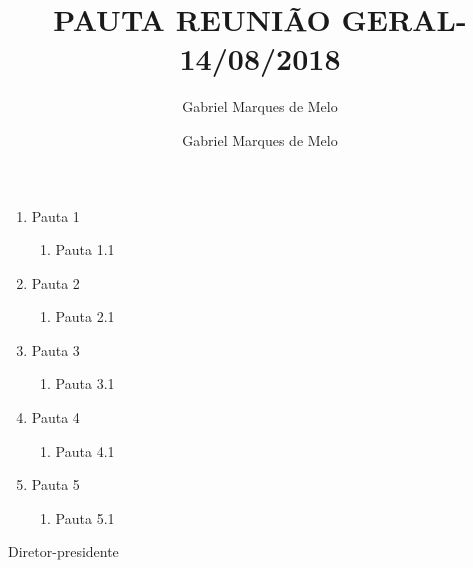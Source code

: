 





\def\reuniao{REUNIÃO GERAL}
\def\data{14/08/2018}
\def\titulo{PAUTA \reuniao - \data}

\title{\titulo}
\date{}
\author{Gabriel Marques de Melo}


	\initdoc    

    \begin{enumerate}
    	\item Pauta 1
    	\begin{enumerate}
    		\item Pauta 1.1
    	\end{enumerate}
    	\item Pauta 2
    	\begin{enumerate}
    		\item Pauta 2.1
    	\end{enumerate}
    	\item Pauta 3
    	\begin{enumerate}
    		\item Pauta 3.1
    	\end{enumerate}
    	\item Pauta 4
    	\begin{enumerate}
    		\item Pauta 4.1
    	\end{enumerate}
    	\item Pauta 5
    	\begin{enumerate}
    		\item Pauta 5.1
    	\end{enumerate}

    \end{enumerate}

    \vfill

    \signature{Gabriel Marques de Melo}{Diretor-presidente}

